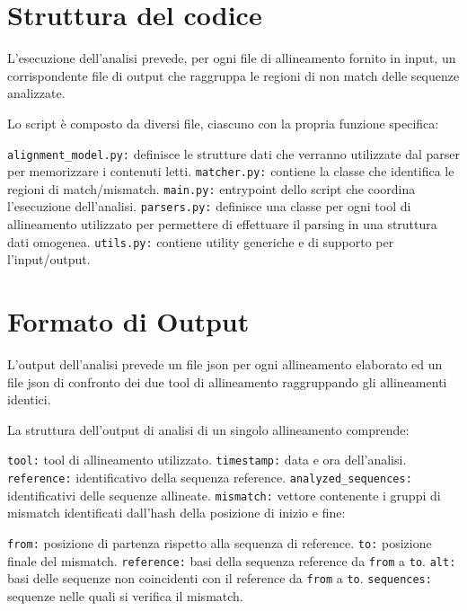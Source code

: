 \documentclass[11pt,italian]{article}
\makeatletter
\newcommand*{\lstitem}[1][]{%
  \setbox0\hbox\bgroup
    \patchcmd{\lst@InlineM}{\@empty}{\@empty\egroup\item[\usebox0]\leavevmode\ignorespaces}{}{}%
    \lstinline[#1]%
}
\makeatother
\begin{document}
\newpage
\section{Struttura del codice}
L'esecuzione dell'analisi prevede, per ogni file di allineamento fornito in input, un corrispondente file di output che raggruppa le regioni di non match delle sequenze analizzate.

\noindent
Lo script è composto da diversi file, ciascuno con la propria funzione specifica:
\begin{description}
  \lstitem{alignment_model.py:} definisce le strutture dati che verranno utilizzate dal parser per memorizzare i contenuti letti.
  \lstitem{matcher.py:} contiene la classe che identifica le regioni di match/mismatch.
  \lstitem{main.py:} entrypoint dello script che coordina l'esecuzione dell'analisi.
  \lstitem{parsers.py:} definisce una classe per ogni tool di allineamento utilizzato per permettere di effettuare il parsing in una struttura dati omogenea.
  \lstitem{utils.py:} contiene utility generiche e di supporto per l'input/output.
\end{description}

\section{Formato di Output}
L'output dell'analisi prevede un file json per ogni allineamento elaborato ed un file json di confronto dei due tool di allineamento raggruppando gli allineamenti identici.

La struttura dell'output di analisi di un singolo allineamento comprende:
\begin{description}
  \lstitem{tool:} tool di allineamento utilizzato.
  \lstitem{timestamp:} data e ora dell'analisi.
  \lstitem{reference:} identificativo della sequenza reference.
  \lstitem{analyzed_sequences:} identificativi delle sequenze allineate.
  \lstitem{mismatch:} vettore contenente i gruppi di mismatch identificati dall'hash della posizione di inizio e fine:
  \begin{description}
    \lstitem{from:} posizione di partenza rispetto alla sequenza di reference.
    \lstitem{to:} posizione finale del mismatch.
    \lstitem{reference:} basi della sequenza reference da \lstinline{from} a \lstinline{to}.
    \lstitem{alt:} basi delle sequenze non coincidenti con il reference da \lstinline{from} a \lstinline{to}.
    \lstitem{sequences:} sequenze nelle quali si verifica il mismatch.
  \end{description}
\end{description}
\end{document}
